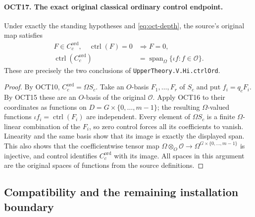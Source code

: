 \documentclass[11pt,a4paper]{article}
\numberwithin{equation}{section}
\theoremstyle{remark}\newtheorem{remark}[theorem]{Remark}
\begin{document}
\paragraph{OCT17. The exact original classical ordinary control endpoint.}
\label{claim:OCT17}
Under exactly the standing hypotheses and
\eqref{eq:oct-depth}, the source's original map satisfies
\begin{align}
 F\in C_c^{\mathrm{ord}},\quad\operatorname{ctrl}(F)=0
                                     &\Longrightarrow F=0,\\
 \operatorname{ctrl}(C_c^{\mathrm{ord}})
                   &=\operatorname{span}_{\Omega}
                                \{\iota f:f\in\mathcal O\}.
 \label{eq:oct-endpoint}
\end{align}
These are precisely the two conclusions of
\texttt{Upper\allowbreak Theory.\allowbreak V.\allowbreak Hi.\allowbreak ctrl\allowbreak Ord}.
\begin{proof}
By OCT10, $C_c^{\mathrm{ord}}=\Omega S_c$.
Take an $O$-basis $F_1,\ldots,\allowbreak{} F_r$ of $S_c$ and put
$f_i=q_cF_i$.  By OCT15 these are an $O$-basis of the
original $\mathcal O$.  Apply OCT16 to their coordinates
as functions on $D=G\times\{0,\ldots,\allowbreak{} m-1\}$; the resulting
$\Omega$-valued functions $\iota f_i=\operatorname{ctrl}(F_i)$
are independent.  Every element of $\Omega S_c$ is a finite
$\Omega$-linear combination of the $F_i$, so zero control
forces all its coefficients to vanish.  Linearity and the
same basis show that its image is exactly the displayed
span.  This also shows that the coefficientwise tensor map
$\Omega\otimes_O\mathcal O\to\Omega^{G\times\{0,\ldots,\allowbreak{} m-1\}}$
is injective, and control identifies $C_c^{\mathrm{ord}}$
with its image.  All spaces in this argument are the
original spaces of functions from the source definitions.
\end{proof}

\subsection{Compatibility and the remaining installation boundary}

\end{document}
